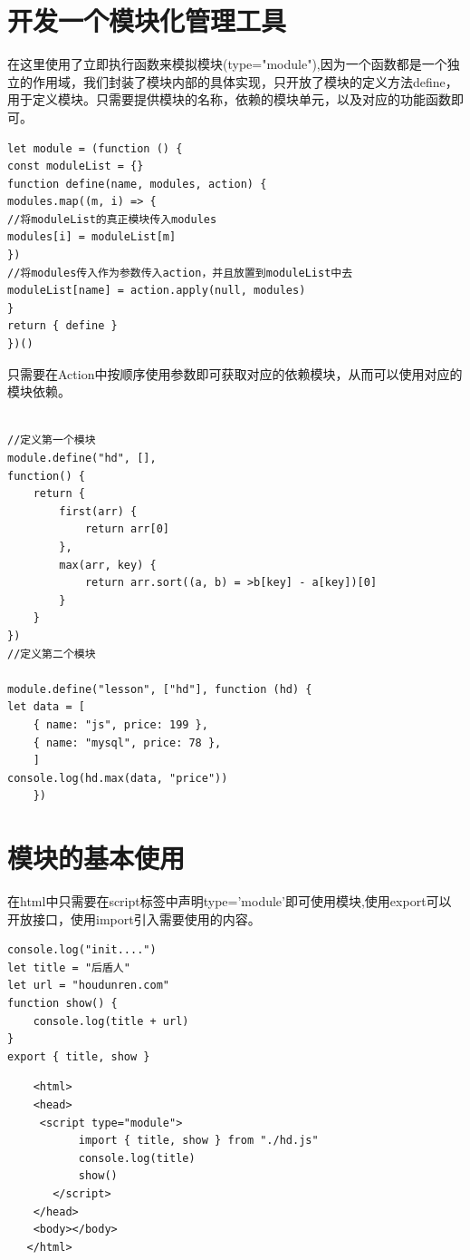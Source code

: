 \documentclass[
	11pt,
	fleqn,
	a4paper,
]{LegrandOrangeBook}
\begin{document}
\section{开发一个模块化管理工具}
在这里使用了立即执行函数来模拟模块(type="module"),因为一个函数都是一个独立的作用域，我们封装了模块内部的具体实现，只开放了模块的定义方法define，用于定义模块。只需要提供模块的名称，依赖的模块单元，以及对应的功能函数即可。
\begin{verbatim}
let module = (function () {
const moduleList = {}
function define(name, modules, action) {
modules.map((m, i) => {
//将moduleList的真正模块传入modules
modules[i] = moduleList[m]
})
//将modules传入作为参数传入action，并且放置到moduleList中去
moduleList[name] = action.apply(null, modules)
}
return { define }
})()
\end{verbatim}
只需要在Action中按顺序使用参数即可获取对应的依赖模块，从而可以使用对应的模块依赖。
\begin{verbatim}

//定义第一个模块
module.define("hd", [],
function() {
    return {
        first(arr) {
            return arr[0]
        },
        max(arr, key) {
            return arr.sort((a, b) = >b[key] - a[key])[0]
        }
    }
})
//定义第二个模块

module.define("lesson", ["hd"], function (hd) {
let data = [
	{ name: "js", price: 199 },
	{ name: "mysql", price: 78 },
	]
console.log(hd.max(data, "price"))
	})
\end{verbatim}
\section{模块的基本使用}
在html中只需要在script标签中声明type='module'即可使用模块,使用export可以开放接口，使用import引入需要使用的内容。

\begin{verbatim}
console.log("init....")
let title = "后盾人"
let url = "houdunren.com"
function show() {
	console.log(title + url)
}
export { title, show }
\end{verbatim}

\begin{verbatim}
    <html>
    <head>
     <script type="module">
           import { title, show } from "./hd.js"
           console.log(title)
           show()
       </script>
    </head>
    <body></body>
   </html>
\end{verbatim}
\end{document}
